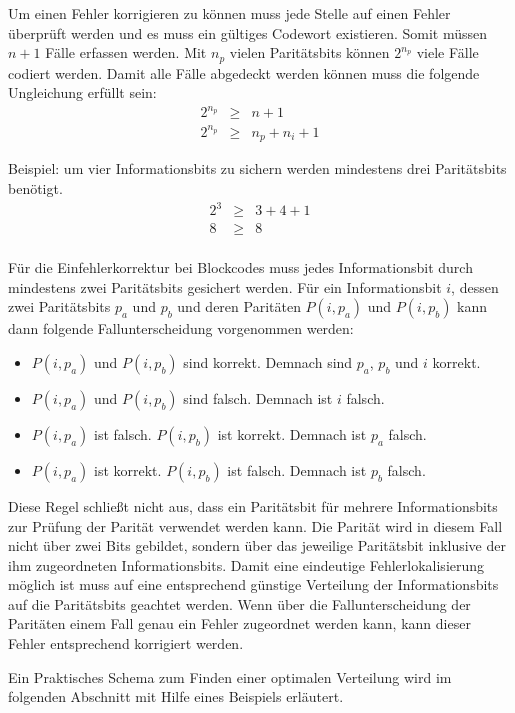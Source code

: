 \documentclass[11pt,a4paper]{scrreprt}
\begin{document}
Um einen Fehler korrigieren zu können muss jede Stelle auf einen Fehler überprüft werden und es muss ein gültiges Codewort existieren. Somit müssen $n+1$ Fälle erfassen werden. Mit $n_p$ vielen Paritätsbits können $2^{n_p}$ viele Fälle codiert werden. Damit alle Fälle abgedeckt werden können muss die folgende Ungleichung erfüllt sein:
\begin{eqnarray*}
2^{n_p} &\ge& n + 1 \\
2^{n_p} &\ge& n_p + n_i + 1
\end{eqnarray*}

Beispiel: um vier Informationsbits zu sichern werden mindestens drei Paritätsbits benötigt.
\begin{eqnarray*}
2^{3} &\ge& 3 + 4 + 1 \\
8 &\ge& 8 \\
\end{eqnarray*}

Für die Einfehlerkorrektur bei Blockcodes muss jedes Informationsbit durch mindestens zwei Paritätsbits gesichert werden. Für ein Informationsbit $i$, dessen zwei Paritätsbits $p_a$ und $p_b$ und deren Paritäten $P(i, p_a)$ und $P(i, p_b)$ kann dann folgende Fallunterscheidung vorgenommen werden:
\begin{itemize}
\item
	$P(i, p_a)$ und $P(i, p_b)$ sind korrekt. Demnach sind $p_a$, $p_b$ und $i$ korrekt.
\item
	$P(i, p_a)$ und $P(i, p_b)$ sind falsch. Demnach ist $i$ falsch.
\item
	$P(i, p_a)$ ist falsch. $P(i, p_b)$ ist korrekt. Demnach ist $p_a$ falsch.
\item
	$P(i, p_a)$ ist korrekt. $P(i, p_b)$ ist falsch. Demnach ist $p_b$ falsch.
\end{itemize}
Diese Regel schließt nicht aus, dass ein Paritätsbit für mehrere Informationsbits zur Prüfung der Parität verwendet werden kann. Die Parität wird in diesem Fall nicht über zwei Bits gebildet, sondern über das jeweilige Paritätsbit inklusive der ihm zugeordneten Informationsbits. Damit eine eindeutige Fehlerlokalisierung möglich ist muss auf eine entsprechend günstige Verteilung der Informationsbits auf die Paritätsbits geachtet werden. Wenn über die Fallunterscheidung der Paritäten einem Fall genau ein Fehler zugeordnet werden kann, kann dieser Fehler entsprechend korrigiert werden.

Ein Praktisches Schema zum Finden einer optimalen Verteilung wird im folgenden Abschnitt mit Hilfe eines Beispiels erläutert.
\end{document}
